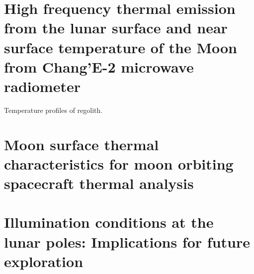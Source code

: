 \documentclass[prl,onecolumn]{revtex4-1}  %
\begin{document}
\section{High frequency thermal emission from the lunar surface and near surface temperature of the Moon from Chang’E-2 microwave radiometer}
Temperature profiles of regolith.
\citep{Tuo}


\section{Moon surface thermal characteristics for moon orbiting spacecraft thermal analysis}
\citep{Giuseppe}

\section{Illumination conditions at the lunar poles: Implications for future exploration}
\citep{Glaser2}
\end{document}
